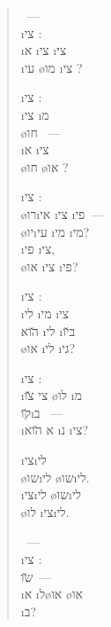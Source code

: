 \begin{verse}
	~—\\
	\i{צי}  :\\
	\i{א} \i{צי} \i{צי}\\
	\i{עי} \o{מו} \i{צי} ?

	\i{צי}  :\\
	\i{צי} \i{מ} \\
	\o{חו} ~—\\
	\i{א}  \i{צי} \\
	\o{חו} \o{או} ?

	\i{צי}  :\\
	\o{רו}\i{אי} \i{צי}  \i{פי}~—\\
	 \o{יו}\i{עי} \i{מי}   \i{מי}?\\
	\i{פי}  \i{צי},\\
	\o{או} \i{צי}  \i{פי}?

	\i{צי}  :\\
	\i{לי}  \i{מי} \i{צי}\\
	\u{הוא} \i{לי}  \i{ב}\u{יו}\\
	\o{או} \i{לי} \i{גי}?

	\i{צי}  :\\
	\i{צי} \u{צו} \o{לו} \i{מ}\\
	\u{קו}\i{ב} ~—\\
	\i{א} \u{הוא} \i{נ} \i{צי}?

	 \i{צי}\i{לי}\\
	\o{שו}\i{לי} \o{שו}\i{לי}.\\
	\i{צי}\i{לי} \o{שו}\i{לי}\\
	\o{לו}  \i{צי}\i{לי}.

	~—\\
	\i{צי}  :\\
	   \u{שו}~—\\
	\i{א}  \i{ל}\o{או} \o{או}\\
	\i{ב}?
\end{verse}
